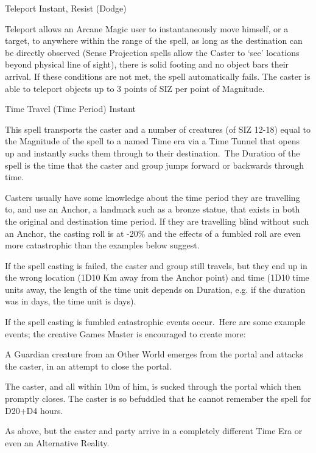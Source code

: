 \begin{samepage}
\begin{rpg-spell}
{Teleport}
{Instant, Resist (Dodge)}

Teleport allows an Arcane Magic user to instantaneously move himself, or a target, to anywhere within the range of the spell, as long as the destination can be directly observed (Sense Projection spells allow the Caster to ‘see’ locations beyond physical line of sight), there is solid footing and no object bars their arrival. If these conditions are not met, the spell automatically fails. The caster is able to teleport objects up to 3 points of SIZ per point of Magnitude.
\end{rpg-spell}
\end{samepage}


\begin{samepage}
\begin{rpg-spell}
{Time Travel (Time Period)}
{Instant}

This spell transports the caster and a number of creatures (of SIZ 12-18) equal to the Magnitude of the spell to a named Time era via a Time Tunnel that opens up and instantly sucks them through to their destination. The Duration of the spell is the time that the caster and group jumps forward or backwards through time. 

Casters usually have some knowledge about the time period they are travelling to, and use an Anchor, a landmark such as a bronze statue, that exists in both the original and destination time period. If they are travelling blind without such an Anchor, the casting roll is at -20\% and the effects of a fumbled roll are even more catastrophic than the examples below suggest. 

If the spell casting is failed, the caster and group still travels, but they end up in the wrong location (1D10 Km away from the Anchor point) and time (1D10 time units away, the length of the time unit depends on Duration, e.g. if the duration was in days, the time unit is days).

If the spell casting is fumbled catastrophic events occur. Here are some example events; the creative Games Master is encouraged to create more:
\begin{rpg-list}
\item A Guardian creature from an Other World emerges from the portal and attacks the caster, in an attempt to close the portal. 
\item The caster, and all within 10m of him, is sucked through the portal which then promptly closes. The caster is so befuddled that he cannot remember the spell for D20+D4 hours. 
\item As above, but the caster and party arrive in a completely different Time Era or even an Alternative Reality.
\end{rpg-list}


\end{rpg-spell}
\end{samepage}
